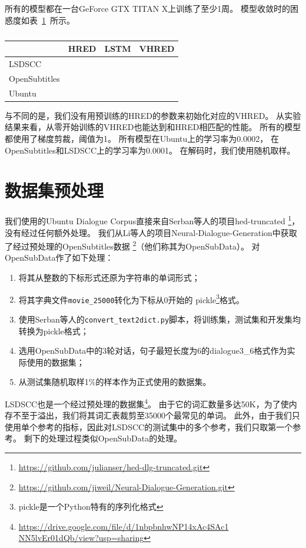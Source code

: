 所有的模型都在一台GeForce GTX TITAN X上训练了至少1周。
模型收敛时的困惑度如表~\ref{tab:converged_perplexity}~所示。
\begin{table}[H]
    \centering
    \caption{}
    \label{tab:converged_perplexity}
    \begin{tabular}{llll}
        \toprule
        & HRED & LSTM & VHRED \\
        \midrule
        LSDSCC & & &  \\
        OpenSubtitles & & &  \\
        Ubuntu & & &  \\
        \bottomrule
    \end{tabular}
\end{table}

与\cite{VHRED}不同的是，我们没有用预训练的HRED的参数来初始化对应的VHRED。
从实验结果来看，从零开始训练的VHRED也能达到和HRED相匹配的性能。
所有的模型都使用了梯度剪裁，阈值为1。
所有模型在Ubuntu上的学习率为0.0002，
在OpenSubtitles和LSDSCC上的学习率为0.0001。
在解码时，我们使用随机取样。

\section{数据集预处理}
\label{sec:dataset_proprecessing}
我们使用的Ubuntu Dialogue Corpus直接来自Serban等人的项目hed-truncated
\footnote{\url{https://github.com/julianser/hed-dlg-truncated.git}}，没有经过任何额外处理。
我们从Li等人的项目Neural-Dialogue-Generation中获取了经过预处理的OpenSubtitles数据
\footnote{\url{https://github.com/jiweil/Neural-Dialogue-Generation.git}}（他们称其为OpenSubData）。
对OpenSubData作了如下处理：
\begin{enumerate}
    \item 将其从整数的下标形式还原为字符串的单词形式；
    \item 将其字典文件\texttt{movie\_25000}转化为下标从0开始的
    pickle\footnote{pickle是一个Python特有的序列化格式}格式。
    \item 使用Serban等人的\texttt{convert\_text2dict.py}脚本，将训练集，测试集和开发集均转换为pickle格式；
    \item 选用OpenSubData中的3轮对话，句子最短长度为6的dialogue3\_6格式作为实际使用的数据集；
    \item 从测试集随机取样1\%的样本作为正式使用的数据集。
\end{enumerate}

LSDSCC也是一个经过预处理的数据集\footnote{\url{https://drive.google.com/file/d/1nbpbnhwNP14xAc4SAc1 NN5lvEr01dQb/view?usp=sharing}}。
由于它的词汇数量多达50K，为了使内存不至于溢出，我们将其词汇表裁剪至35000个最常见的单词。
此外，由于我们只使用单个参考的指标，因此对LSDSCC的测试集中的多个参考，我们只取第一个参考。
剩下的处理过程类似OpenSubData的处理。

